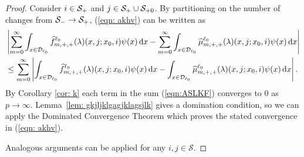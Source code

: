 \begin{proof}
	 
	
	Consider \(i\in\mathcal{S}_+\) and \(j\in\mathcal{S}_+\cup\mathcal{S}_{+0}\). By partitioning on the number of changes from \(\mathcal{S}_-\to\mathcal{S}_+\), (\ref{eqn: akhv}) can be written as
	\begin{align}
		&\left|\sum_{m=0}^\infty \int_{x\in\mathcal{D}_{\ell_0}}\widehat f^{\ell_0}_{m,+,+}(\lambda)(x,j;x_0,i)\psi(x)\, \mathrm{d} x
		-
		\sum_{m=0}^\infty \int_{x\in\mathcal{D}_{\ell_0}} \widehat \mu^{\ell_0}_{m,+,+}(\lambda)(x,j;x_0,i)\psi(x)\, \mathrm{d} x\right| \nonumber
		\\&\leq \sum_{m=0}^\infty \left| \int_{x\in\mathcal{D}_{\ell_0}}\widehat f^{\ell_0}_{m,+,+}(\lambda)(x,j;x_0,i)\psi(x)\, \mathrm{d} x
		-
		\int_{x\in\mathcal{D}_{\ell_0}} \widehat \mu^{\ell_0}_{m,+,+}(\lambda)(x,j;x_0,i)\psi(x)\, \mathrm{d} x\right|. \label{eqn:ASLKF}
        \end{align}
        By Corollary \ref{cor: k} each term in the sum (\ref{eqn:ASLKF}) converges to \(0\) as \(p\to\infty\). Lemma~\ref{lem: gkjljklgagjklagsjlk} gives a domination condition, so we can apply the Dominated Convergence Theorem which proves the stated convergence in (\ref{eqn: akhv}).
        
        Analogous arguments can be applied for any \(i,j\in\mathcal S\). 
\end{proof}

